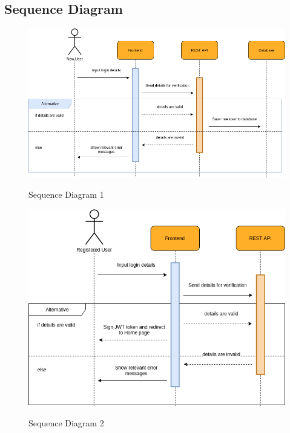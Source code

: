 \subsection{Sequence Diagram}


\begin{figure}[H]
    \centering
    \caption{Sequence Diagram 1}
    \includegraphics[scale=0.5]{./diagrams/sequence/seq-01.png}
    \label{fig:seq-01}
    
\end{figure}


\begin{figure}[H]
    \centering
    \caption{Sequence Diagram 2}
    \includegraphics[scale=0.5]{./diagrams/sequence/seq-02.png}
    \label{fig:seq-02}
    
\end{figure}


